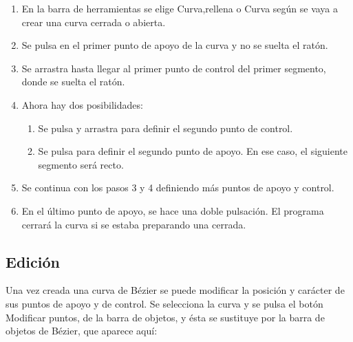\begin{enumerate}
\item En la barra de herramientas se elige Curva,rellena o Curva 
según se vaya a crear una curva cerrada o abierta.

\item Se pulsa en el primer punto de apoyo de la curva y no se 
suelta el ratón.

\item Se arrastra hasta llegar al primer punto de control del 
primer segmento, donde se suelta el ratón.

\item Ahora hay dos posibilidades:

\begin{enumerate}
\item Se pulsa y arrastra para definir el segundo punto de 
control.

\item Se pulsa para definir el segundo punto de apoyo. En ese 
caso, el siguiente segmento será recto.
\end{enumerate}

\item Se continua con los pasos 3 y 4 definiendo más puntos 
de apoyo y control.

\item En el último punto de apoyo, se hace una doble pulsación. 
El programa cerrará la curva si se estaba preparando una cerrada.
\end{enumerate}

\subsection{Edición}

Una vez creada una curva de Bézier se puede modificar la posición y
carácter de sus puntos de apoyo y de control. Se selecciona la curva y
se pulsa el botón Modificar puntos, de la barra de objetos, y ésta se
sustituye por la barra de objetos de Bézier, que aparece aquí:

